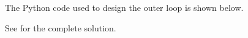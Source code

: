 The Python code used to design the outer loop is shown below.


%
%
%        
%
%
%
%
%
%
%
%

See  for the complete solution.


